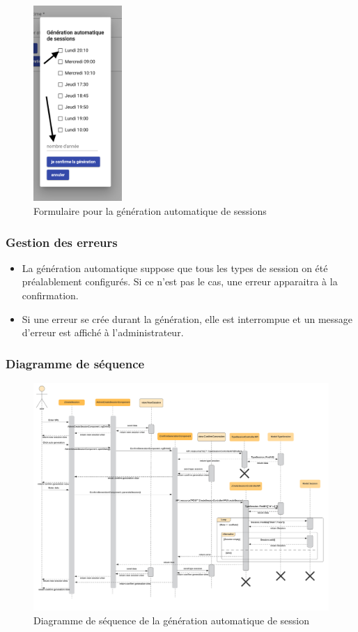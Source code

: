 \vspace{\baselineskip}
\begin{figure}[h]
	\includegraphics[width=0.3\textwidth,center]{Figures/us16-3}
	\caption{Formulaire pour la génération automatique de sessions}
\end{figure}


\subsubsection{Gestion des erreurs}
	\begin{itemize}
		\item La génération automatique suppose que tous les types de session on été préalablement configurés. Si ce n'est pas le cas, une erreur apparaitra à la confirmation.
		\item Si une erreur se crée durant la génération, elle est interrompue et un message d'erreur est affiché à l'administrateur.
	\end{itemize}
	
\newpage
\subsubsection{Diagramme de séquence}
	\begin{figure}[h]
		\includegraphics[width=\textwidth,center]{Diagramme/sequence-us16}
		\caption{Diagramme de séquence de la génération automatique de session}
	\end{figure}
	

